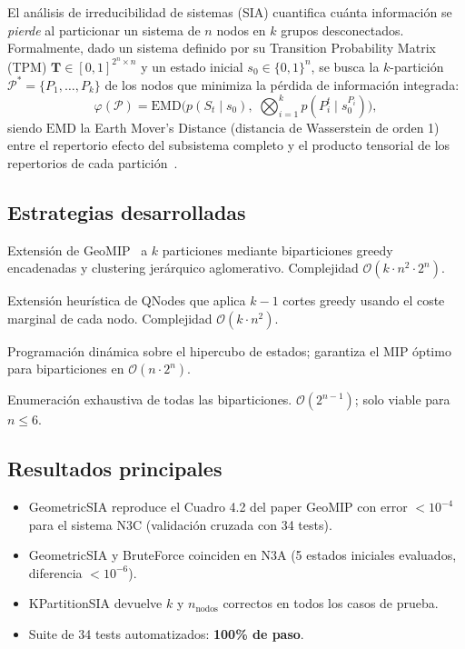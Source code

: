 \documentclass[11pt,letterpaper]{article}
\newcommand{\EMD}{\mathrm{EMD}}
\newcommand{\phi}{\varphi}
\newcommand{\tpm}{\mathbf{T}}
\newcommand{\parti}{\mathcal{P}}
\begin{document}
El análisis de irreducibilidad de sistemas (SIA) cuantifica cuánta información
se \emph{pierde} al particionar un sistema de $n$ nodos en $k$ grupos
desconectados.  Formalmente, dado un sistema definido por su
Transition Probability Matrix (TPM) $\tpm \in [0,1]^{2^n \times n}$ y un estado
inicial $s_0 \in \{0,1\}^n$, se busca la $k$-partición
$\parti^* = \{P_1,\ldots,P_k\}$ de los nodos que minimiza la pérdida de
información integrada:
\[
  \phi(\parti) = \EMD\!\bigl(p(S_t \mid s_0),\;
                             \bigotimes_{i=1}^k p(P_i^{t} \mid s_0^{P_i})\bigr),
\]
siendo $\EMD$ la Earth Mover's Distance (distancia de Wasserstein de orden 1)
entre el repertorio efecto del subsistema completo y el producto tensorial de
los repertorios de cada partición~\cite{tononi2016}.

\subsection{Estrategias desarrolladas}

\begin{description}[style=nextline]
  \item[\textbf{KGeoMIP} (\texttt{KPartitionSIA})]
    Extensión de GeoMIP~\cite{geomip2025} a $k$ particiones mediante
    biparticiones greedy encadenadas y clustering jerárquico aglomerativo.
    Complejidad $\mathcal{O}(k \cdot n^2 \cdot 2^n)$.
  \item[\textbf{KQNodes} (\texttt{QNodes} extendido)]
    Extensión heurística de QNodes que aplica $k-1$ cortes greedy usando
    el coste marginal de cada nodo.  Complejidad $\mathcal{O}(k \cdot n^2)$.
  \item[\textbf{GeometricSIA} (base, $k=2$)]
    Programación dinámica sobre el hipercubo de estados; garantiza el MIP óptimo
    para biparticiones en $\mathcal{O}(n \cdot 2^n)$.
  \item[\textbf{BruteForce} (referencia)]
    Enumeración exhaustiva de todas las biparticiones.
    $\mathcal{O}(2^{n-1})$; solo viable para $n \le 6$.
\end{description}

\subsection{Resultados principales}

\begin{itemize}
  \item GeometricSIA reproduce el Cuadro 4.2 del paper GeoMIP con error
        $< 10^{-4}$ para el sistema N3C (validación cruzada con 34 tests).
  \item GeometricSIA y BruteForce coinciden en N3A (5 estados iniciales
        evaluados, diferencia $< 10^{-6}$).
  \item KPartitionSIA devuelve $k$ y $n_\text{nodos}$ correctos en todos los
        casos de prueba.
  \item Suite de 34 tests automatizados: \textbf{100\% de paso}.
\end{itemize}
\end{document}
